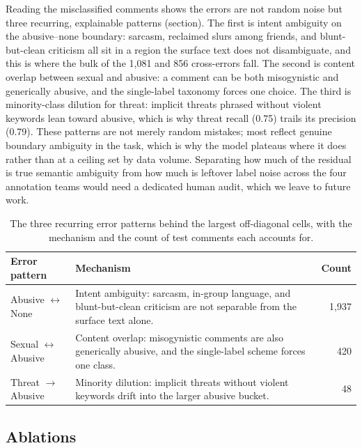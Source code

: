 \documentclass[11pt,a4paper]{article}
\def\cref#1{section}%
\def\emph#1{#1}%
\begin{document}
Reading the misclassified comments shows the errors are not random noise but three recurring, explainable patterns (\cref{tab:errorpatterns}). The first is intent ambiguity on the \emph{abusive}--\emph{none} boundary: sarcasm, reclaimed slurs among friends, and blunt-but-clean criticism all sit in a region the surface text does not disambiguate, and this is where the bulk of the 1{,}081 and 856 cross-errors fall. The second is content overlap between \emph{sexual} and \emph{abusive}: a comment can be both misogynistic and generically abusive, and the single-label taxonomy forces one choice. The third is minority-class dilution for \emph{threat}: implicit threats phrased without violent keywords lean toward \emph{abusive}, which is why \emph{threat} recall (0.75) trails its precision (0.79). These patterns are not merely random mistakes; most reflect genuine boundary ambiguity in the task, which is why the model plateaus where it does rather than at a ceiling set by data volume. Separating how much of the residual is true semantic ambiguity from how much is leftover label noise across the four annotation teams would need a dedicated human audit, which we leave to future work.

\begin{table}[!htbp]
\centering
\caption{The three recurring error patterns behind the largest off-diagonal cells, with the mechanism and the count of test comments each accounts for.}
\label{tab:errorpatterns}
\small
\begin{tabularx}{\textwidth}{@{}l>{\raggedright\arraybackslash}Xr@{}}
\toprule
\textbf{Error pattern} & \textbf{Mechanism} & \textbf{Count} \\
\midrule
Abusive $\leftrightarrow$ None & Intent ambiguity: sarcasm, in-group language, and blunt-but-clean criticism are not separable from the surface text alone. & 1{,}937 \\
Sexual $\leftrightarrow$ Abusive & Content overlap: misogynistic comments are also generically abusive, and the single-label scheme forces one class. & 420 \\
Threat $\to$ Abusive & Minority dilution: implicit threats without violent keywords drift into the larger \emph{abusive} bucket. & 48 \\
\bottomrule
\end{tabularx}
\end{table}

\subsection{Ablations}
\label{sec:ablation-results}
\end{document}
